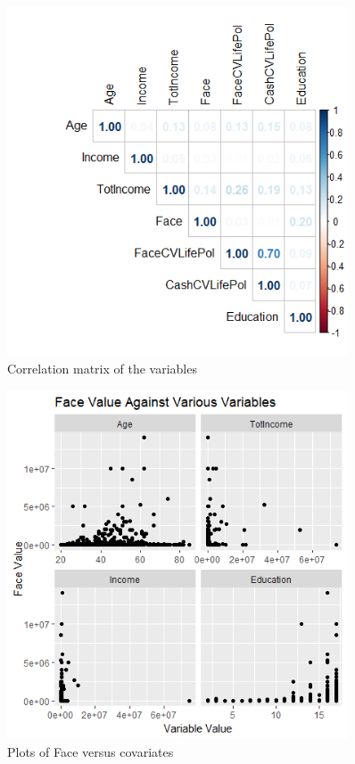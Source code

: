 \documentclass[12pt, twoside,hidelinks]{article}
\theoremstyle{definition}
\numberwithin{equation}{section}
\begin{document}
\newpage
\begin{figure}[H]
    \centering
    \includegraphics[width=0.9\textwidth]{visuals/InsuranceVisuals/UsTermCorr.png}
    \caption{Correlation matrix of the variables}
    \label{fig:cor_variables}
\end{figure}
\newpage
\begin{figure}[H]
    \centering
    \includegraphics[width=0.9\textwidth]{visuals/InsuranceVisuals/FaceValueVcovariates.png}
    \caption{Plots of Face versus covariates}
    \label{fig:FaceVscovariates}
\end{figure}
\end{document}
